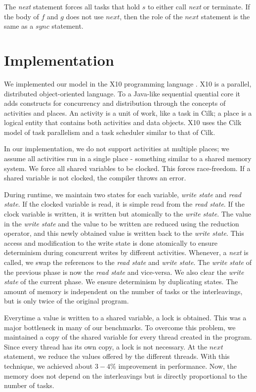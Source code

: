 \documentclass[10pt, conference, compsocconf]{IEEEtran}
\begin{document}
The \emph{next} statement forces all tasks that hold $s$ to either
call \emph{next} or terminate. If the body of $f$ and $g$ does not
use $next$, then the role of the $next$ statement is the same as a $sync$
statement.


\section{Implementation}
\label{sec:implementation}

We implemented our model in the X10 programming language \cite{charles2005x10}.
X10 is a parallel, distributed object-oriented language. To a Java-like sequential 
quential core it adds constructs for concurrency and distribution through the 
concepts of activities and places. An activity is a unit of work, like a task in 
Cilk; a place is a logical entity that contains both activities and data objects.
X10 uses the Cilk model of task parallelism and a task scheduler similar to that
of Cilk.

In our implementation, we do not support activities at multiple places; we assume all activities run
in a single place - something similar to a shared memory system. 
We force all shared variables to be clocked. This forces
race-freedom. If a shared variable is not clocked, the compiler throws
an error.

During runtime, we maintain two states for each variable, \emph{write state} and \emph{read state}.
If the clocked variable is read, it is simple read from the \emph{read state}. If the clock
variable is written, it is written but atomically to the \emph{write state}.  The value in the \emph{write
state} and the value to be written are reduced using the reduction operator, and this newly obtained
value is written back to the \emph{write state}. This access and modification to the write state is done
atomically to ensure determinism during concurrent writes by different activities.
Whenever, a \emph{next} is called, we swap the references to the \emph{read state} and \emph{write state}.
The \emph{write state} of the previous phase is now the \emph{read state} and vice-versa.
We also clear the \emph{write state} of the current phase.
We ensure determinism by duplicating states. The amount of memory is independent on the number
of tasks or the interleavings, but is only twice of the original program.


Everytime a value is written to a shared variable, a lock is obtained. This was a major
bottleneck in many of our benchmarks. To overcome this problem, we maintained a copy
of the shared variable for every thread created in the program. Since every thread
has its own copy, a lock is not necessary. At the $next$ statement, we reduce
the values offered by the different threads. With this technique, we achieved
about $3-4\%$ improvement in performance. Now, the memory does not depend
on the interleavings but is directly proportional to the number of tasks.
\end{document}
